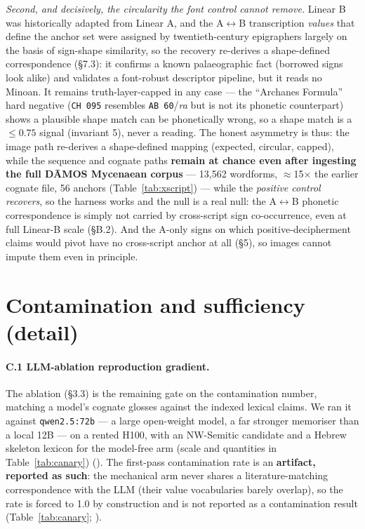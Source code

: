 \emph{Second, and decisively, the circularity the font control cannot
remove.} Linear B was historically adapted from Linear A, and the
A$\leftrightarrow$B transcription \emph{values} that define the anchor set
were assigned by twentieth-century epigraphers largely on the basis of
sign-shape similarity, so the recovery re-derives a shape-defined
correspondence (\S7.3): it confirms a known palaeographic fact (borrowed
signs look alike) and validates a font-robust descriptor pipeline, but it
reads no Minoan. It remains truth-layer-capped in any case --- the
\citet{ferrara2021} ``Archanes Formula'' hard negative (\texttt{CH 095}
resembles \texttt{AB 60}/\emph{ra} but is not its phonetic counterpart)
shows a plausible shape match can be phonetically wrong, so a shape match is
a $\le 0.75$ signal (invariant 5), never a reading. The honest asymmetry is
thus: the image path re-derives a shape-defined mapping (expected, circular,
capped), while the sequence and cognate paths \textbf{remain at chance even
after ingesting the full D\=AMOS Mycenaean corpus} --- 13,562 wordforms,
$\approx$15$\times$ the earlier cognate file, 56 anchors
(Table~\ref{tab:xscript}) --- while the \emph{positive control
recovers}, so the harness works and the null is a real null: the
A$\leftrightarrow$B phonetic correspondence is simply not carried by
cross-script sign co-occurrence, even at full Linear-B scale
(\S B.2). And the A-only signs on which
positive-decipherment claims would pivot have no cross-script
anchor at all (\S5), so images cannot impute them even in principle.

\section{Contamination and sufficiency (detail)}

\paragraph{C.1 LLM-ablation reproduction gradient.} The ablation
(\S3.3) is the remaining gate on the contamination number, matching a
model's cognate glosses against the indexed lexical claims. We ran it
against \texttt{qwen2.5:72b} --- a large open-weight model, a far
stronger memoriser than a local 12B --- on a rented H100, with an
NW-Semitic candidate and a Hebrew skeleton lexicon for the model-free arm
(scale and quantities in Table~\ref{tab:canary}) (\artref). The
first-pass contamination rate is an \textbf{artifact, reported as such}:
the mechanical arm never shares a literature-matching correspondence with
the LLM (their value vocabularies barely overlap), so the rate is forced
to 1.0 by construction and is not reported as a contamination result
(Table~\ref{tab:canary}; \artref).

